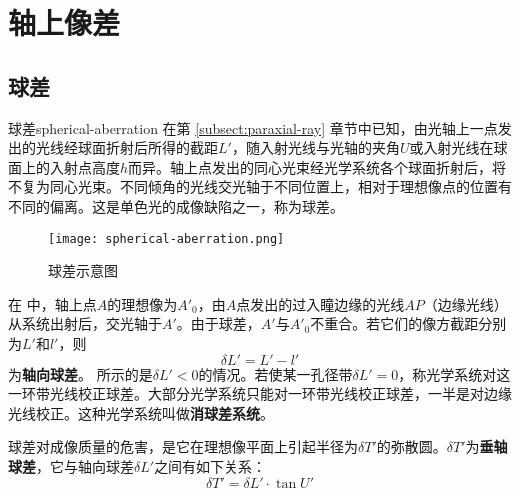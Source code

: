 \documentclass[cn,10pt,chinesefont=founder,math=mtpro2,cite=super,toc=onecol,twoside,openany]{elegantbook}
\begin{document}
\section{轴上像差}
\subsection{球差}
\begin{definition}{球差}{spherical-aberration}
在第 \ref{subsect:paraxial-ray} 章节中已知，由光轴上一点发出的光线经球面折射后所得的截距$L'$，随入射光线与光轴的夹角$U$或入射光线在球面上的入射点高度$h$而异。轴上点发出的同心光束经光学系统各个球面折射后，将不复为同心光束。不同倾角的光线交光轴于不同位置上，相对于理想像点的位置有不同的偏离。这是单色光的成像缺陷之一，称为球差。
\end{definition}

\begin{figure}[htbp]
	\centering
	\texttt{[image: spherical-aberration.png]}
	\caption{球差示意图}
	\label{fig:spherical-aberration}
\end{figure}

在 中，轴上点$A$的理想像为$A'_0$，由$A$点发出的过入瞳边缘的光线$AP$（边缘光线）从系统出射后，交光轴于$A'$。由于球差，$A'$与$A'_0$不重合。若它们的像方截距分别为$L'$和$l'$，则
\begin{equation}
\delta L'=L'-l'
\label{eq:spherical-aberration}
\end{equation}
为\textbf{轴向球差}。 所示的是$\delta L'<0$的情况。若使某一孔径带$\delta L'=0$，称光学系统对这一环带光线校正球差。大部分光学系统只能对一环带光线校正球差，一半是对边缘光线校正。这种光学系统叫做\textbf{消球差系统}。

球差对成像质量的危害，是它在理想像平面上引起半径为$\delta T'$的弥散圆。$\delta T'$为\textbf{垂轴球差}，它与轴向球差$\delta L'$之间有如下关系：
\begin{equation}
\delta T'=\delta L'\cdot\tan U'
\label{eq:spherical-aberration-relationship}
\end{equation}
\end{document}
